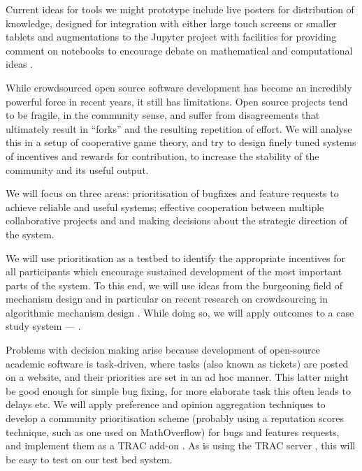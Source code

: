 \begin{workpackage}[id=social-aspects,wphases=0-48,
  title=Social Aspects,
  lead=UO,
  UORM=23,USHRM=8,USORM=6]
\begin{tasklist}
\begin{task}[title=Implications of VREs for Publication,id=social-output,lead=USH,partners={UO,PS}]
Current ideas for tools we might prototype include live posters for
distribution of knowledge, designed for integration with either large
touch screens or smaller tablets  and
augmentations to the Jupyter project with facilities for providing comment
on notebooks to encourage debate on mathematical and computational
ideas .
\end{task}



\begin{task}[title=Mechanism Design for free software development,pm=15,lead=UO,
id=isocial-decisionmaking]

While crowdsourced open source software development has become an
incredibly powerful force in recent years, it still has limitations. 
Open source projects tend to be fragile, in the community sense, and
suffer from disagreements that ultimately result in ``forks'' and the
resulting repetition of effort. We will analyse this in a setup of
cooperative game theory, and try to design finely tuned systems of
incentives and rewards for contribution, to increase the stability of
the community and its useful output.

We will focus on three areas: prioritisation of bugfixes and feature
requests to achieve reliable and useful systems; effective cooperation between multiple collaborative
projects and and making decisions about
the strategic direction of the system.  

We will use prioritisation as a testbed to identify the appropriate incentives for all
participants which encourage sustained development
of the most important parts of the system.
To this end, we will use
ideas from the burgeoning field of mechanism design \cite{AGTbook} and
in particular on recent research on crowdsourcing in algorithmic
mechanism design \cite{crowds}.  While doing so, we will apply
outcomes to a case study system --- \Sage.  

Problems with decision making arise because 
development of open-source academic software is task-driven,
where tasks (also known as tickets) are posted on a website, and their
priorities are set in an ad hoc manner.  This latter might be
good enough for simple bug fixing, for more elaborate task this often
leads to delays etc.  
We will apply preference
and opinion aggregation techniques \cite{pref-aggr} to develop a
community prioritisation scheme (probably using a reputation scores
technique, such as one used on MathOverflow) for bugs and features requests,
and implement them as a TRAC \cite{Trac} add-on 
.
As \Sage is using the TRAC server \cite{trac-sagemath}, 
this will be easy to test on our test bed system.


\end{task}
\end{tasklist}
\end{workpackage}
